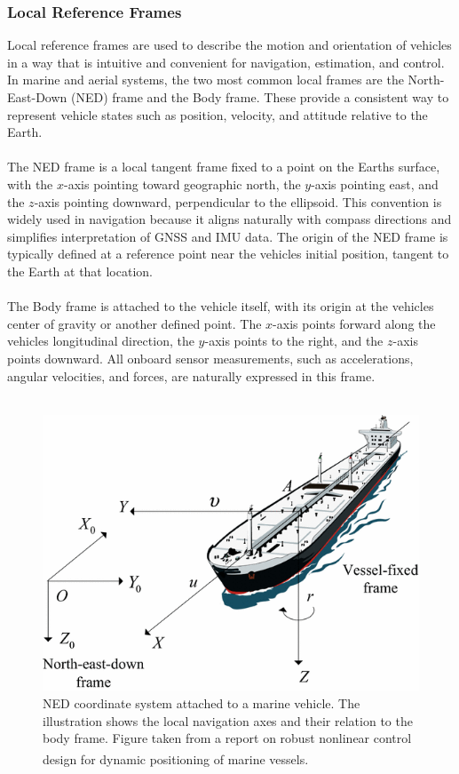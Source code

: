 \subsubsection{Local Reference Frames}
Local reference frames are used to describe the motion and orientation of vehicles in a way that is intuitive and convenient for navigation, estimation, and control. In marine and aerial systems, the two most common local frames are the North-East-Down (NED) frame and the Body frame. These provide a consistent way to represent vehicle states such as position, velocity, and attitude relative to the Earth.  
\\ \\
The NED frame is a local tangent frame fixed to a point on the Earths surface, with the $x$-axis pointing toward geographic north, the $y$-axis pointing east, and the $z$-axis pointing downward, perpendicular to the ellipsoid. This convention is widely used in navigation because it aligns naturally with compass directions and simplifies interpretation of GNSS and IMU data. The origin of the NED frame is typically defined at a reference point near the vehicles initial position, tangent to the Earth at that location.  
\\ \\
The Body frame is attached to the vehicle itself, with its origin at the vehicles center of gravity or another defined point. The $x$-axis points forward along the vehicles longitudinal direction, the $y$-axis points to the right, and the $z$-axis points downward. All onboard sensor measurements, such as accelerations, angular velocities, and forces, are naturally expressed in this frame.  
\\ \\
\begin{figure}[H]
    \centering
    \includegraphics[width=0.55\linewidth]{Pictures/System_Modeling/Reference_Frames_and_Transformations/NED.png}
    \caption{NED coordinate system attached to a marine vehicle. The illustration shows the local navigation axes and their relation to the body frame. Figure taken from a report on robust nonlinear control design for dynamic positioning of marine vessels.\textsuperscript{\cite{NED}}}
    \label{fig:system-modeling-ned-frame}
\end{figure}
